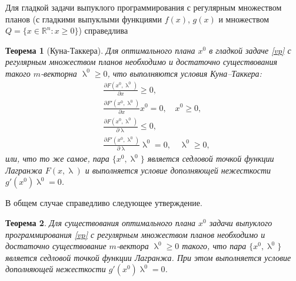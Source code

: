 \documentclass[a4paper, 12pt]{report}
\numberwithin{equation}{section}
\renewcommand{\leq}{\leqslant}
\renewcommand{\geq}{\geqslant}
\renewcommand{\lambda}{\uplambda}
\newtheorem*{theorem}{Теорема}
\begin{document}
	Для гладкой задачи выпуклого программирования с регулярным множеством планов (с гладкими выпуклыми функциями $f(x)$, $g(x)$ и множеством $Q = \{ x \in \mathbb{R}^n : x \geq 0 \}$) справедлива
	\begin{theorem}
		[Куна-Таккера]
		Для оптимального плана $x^0$ в гладкой задаче \eqref{vp} с регулярным множеством планов необходимо и достаточно существования такого $m$-векторна $\lambda^0\geq 0$, что выполняются условия Куна--Таккера:
		\[
		\begin{aligned}
			&\frac{\partial F(x^0, \lambda^0)}{\partial x} \geq 0, \\
			&\frac{\partial F'(x^0, \lambda^0)}{\partial x}x^0 = 0, \quad x^0 \geq 0, \\
			&\frac{\partial F(x^0, \lambda^0)}{\partial \lambda} \leq 0, \\
			&\frac{\partial F'(x^0, \lambda^0)}{\partial \lambda}\lambda^0 = 0, \quad \lambda^0 \geq 0,
		\end{aligned}
		\]
		или, что то же самое, пара $\{x^0, \lambda^0\}$ является седловой точкой функции Лагранжа $F(x, \lambda)$ и выполняется условие дополняющей нежесткости $g'(x^0)\lambda^0 = 0$.
	\end{theorem}
	\noindent
	В общем случае справедливо следующее утверждение.
	\begin{theorem}
		Для существования оптимального плана $x^0$ задачи выпуклого программирования \eqref{vp} с регулярным множеством планов необходимо и достаточно существование $m$-вектора $\lambda^0 \geq 0$ такого, что пара $\{x^0, \lambda^0\}$ является седловой точкой функции Лагранжа. При этом выполняется условие дополняющей нежесткости $g'(x^0)\lambda^0 = 0$.
	\end{theorem}
\end{document}
